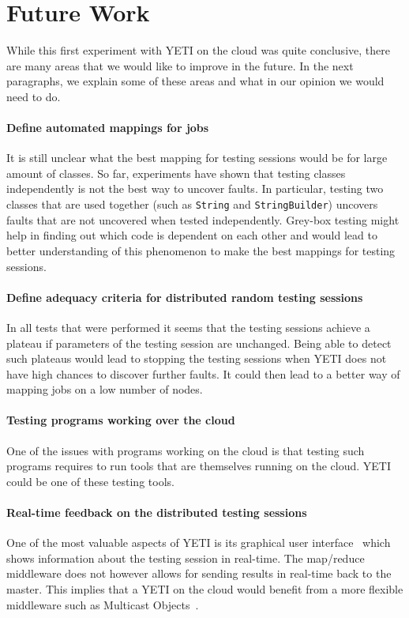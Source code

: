 \section{Future Work}\label{sec:future}

While this first experiment with YETI on the cloud was quite 
conclusive, there are many areas that we would like to improve 
in the future. In the next paragraphs, we explain some of these 
areas and what in our opinion we would need to do.

\paragraph{Define automated mappings for jobs}
It is still unclear what the best mapping for testing sessions would be for large 
amount of classes. So far, experiments have shown that testing classes
independently is not the best way to uncover faults. In particular, 
testing two classes that are used together (such as \texttt{String} and 
\texttt{StringBuilder}) uncovers faults that are not uncovered when tested 
independently. Grey-box testing might help in finding out which code is dependent 
on each other and would lead to better understanding of this phenomenon to make
the best mappings for testing sessions.

\paragraph{Define adequacy criteria for distributed random testing sessions}
In all tests that were performed it seems that the testing sessions
achieve a plateau if parameters of the testing session are unchanged. 
Being able to detect such plateaus would lead to stopping the testing sessions
when YETI does not have high chances to discover further faults. It could then
lead to a better way of mapping jobs on a low number of nodes.


\paragraph{Testing programs working over the cloud}
One of the issues with programs working on the cloud is that testing such 
programs requires to run tools that are themselves running on the cloud.
YETI could be one of these testing tools.


\paragraph{Real-time feedback on the distributed testing sessions}
One of the most valuable aspects of YETI is its graphical user interface~\cite{OriolTassis2010} 
which shows information about the testing session in real-time. The 
map/reduce middleware does not however allows for sending results in real-time
back to the master. This implies that a YETI on the cloud would benefit from a more 
flexible middleware such as Multicast Objects~\cite{mobjectsTR}.
